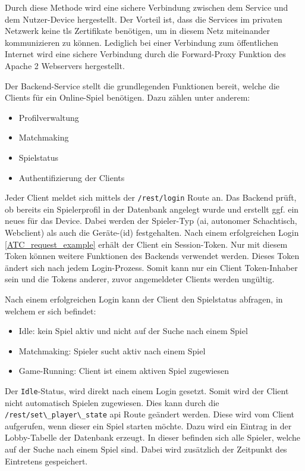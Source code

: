 Durch diese Methode wird eine sichere Verbindung zwischen dem Service
und dem Nutzer-Device hergestellt. Der Vorteil ist, dass die Services im
privaten Netzwerk keine \gls{tls} Zertifikate benötigen, um in diesem
Netz miteinander kommunizieren zu können. Lediglich bei einer Verbindung
zum öffentlichen Internet wird eine sichere Verbindung durch die
Forward-Proxy Funktion des Apache 2 Webservers hergestellt.

Der Backend-Service stellt die grundlegenden Funktionen bereit, welche
die Clients für ein Online-Spiel benötigen. Dazu zählen unter anderem:

\begin{itemize}
\tightlist
\item
  Profilverwaltung
\item
  Matchmaking
\item
  Spielstatus
\item
  Authentifizierung der Clients
\end{itemize}

Jeder Client meldet sich mittels der
\passthrough{\lstinline!/rest/login!} Route an. Das Backend prüft, ob
bereits ein Spielerprofil in der Datenbank angelegt wurde und erstellt
ggf. ein neues für das Device. Dabei werden der Spieler-Typ (\gls{ai},
autonomer Schachtisch, Webclient) als auch die Geräte-(id) festgehalten.
Nach einem erfolgreichen Login \ref{ATC_request_example} erhält der
Client ein Session-Token. Nur mit diesem Token können weitere Funktionen
des Backends verwendet werden. Dieses Token ändert sich nach jedem
Login-Prozess. Somit kann nur ein Client Token-Inhaber sein und die
Tokens anderer, zuvor angemeldeter Clients werden ungültig.

Nach einem erfolgreichen Login kann der Client den Spielstatus abfragen,
in welchem er sich befindet:

\begin{itemize}
\tightlist
\item
  Idle: kein Spiel aktiv und nicht auf der Suche nach einem Spiel
\item
  Matchmaking: Spieler sucht aktiv nach einem Spiel
\item
  Game-Running: Client ist einem aktiven Spiel zugewiesen
\end{itemize}

Der \passthrough{\lstinline!Idle!}-Status, wird direkt nach einem Login
gesetzt. Somit wird der Client nicht automatisch Spielen zugewiesen.
Dies kann durch die \passthrough{\lstinline!/rest/set\_player\_state!}
\gls{api} Route geändert werden. Diese wird vom Client aufgerufen, wenn
dieser ein Spiel starten möchte. Dazu wird ein Eintrag in der
Lobby-Tabelle der Datenbank erzeugt. In dieser befinden sich alle
Spieler, welche auf der Suche nach einem Spiel sind. Dabei wird
zusätzlich der Zeitpunkt des Eintretens gespeichert.

